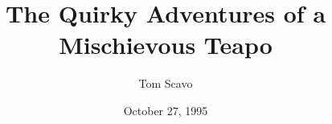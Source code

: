 \documentclass[]{article}   %
\begin{document}
\title{The Quirky Adventures of a Mischievous Teapo}   %
\author{Tom Scavo}         %
\date{October 27, 1995}    %
\maketitle








\end{document}
